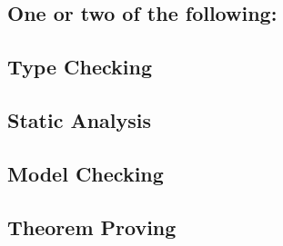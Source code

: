 \subsection{One or two of the following:}

\subsection{Type Checking}

\subsection{Static Analysis}

\subsection{Model Checking}

\subsection{Theorem Proving}
